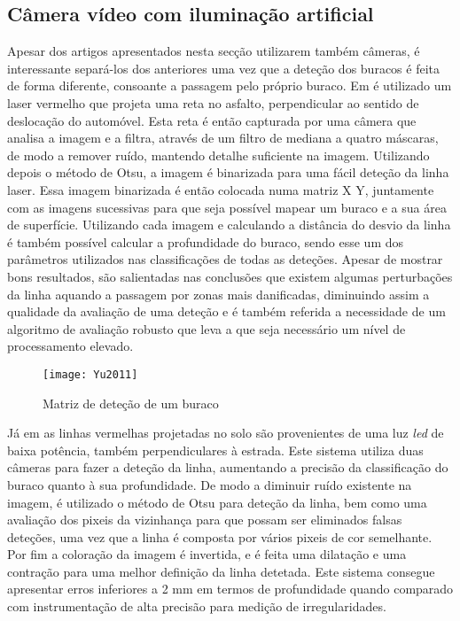 \subsection{Câmera vídeo com iluminação artificial}
\label{subsec: camera_video_com_iluminacao_artificial}
Apesar dos artigos apresentados nesta secção utilizarem também câmeras, é interessante separá-los dos anteriores uma vez que a deteção dos buracos é feita de forma diferente, consoante a passagem pelo próprio buraco. Em \cite{Yu2011} é utilizado um laser vermelho que projeta uma reta no asfalto, perpendicular ao sentido de deslocação do automóvel. Esta reta é então capturada por uma câmera que analisa a imagem e a filtra, através de um filtro de mediana a quatro máscaras, de modo a remover ruído, mantendo detalhe suficiente na imagem.
Utilizando depois o método de Otsu, a imagem é binarizada para uma fácil deteção da linha laser.
Essa imagem binarizada é então colocada numa matriz X Y, juntamente com as imagens sucessivas para que seja possível mapear um buraco e a sua área de superfície.
Utilizando cada imagem e calculando a distância do desvio da linha é também possível calcular a profundidade do buraco, sendo esse um dos parâmetros utilizados nas classificações de todas as deteções.
Apesar de mostrar bons resultados, são salientadas nas conclusões que existem algumas perturbações da linha aquando a passagem por zonas mais danificadas, diminuindo assim a qualidade da avaliação de uma deteção e é também referida a necessidade de um algoritmo de avaliação robusto que leva a que seja necessário um nível de processamento elevado.

\begin{figure}[htbp]
	\centering
	\texttt{[image: Yu2011]}
	\caption[Matriz de deteção de um buraco]{Matriz de deteção de um buraco \footnotemark}
	\label{fig:sensor_kinect}
\end{figure}

Já em \cite{He2011} as linhas vermelhas projetadas no solo são provenientes de uma luz \emph{led} de baixa potência, também perpendiculares à estrada. Este sistema utiliza duas câmeras para fazer a deteção da linha, aumentando a precisão da classificação do buraco quanto à sua profundidade.
De modo a diminuir ruído existente na imagem, é utilizado o método de Otsu para deteção da linha, bem como uma avaliação dos pixeis da vizinhança para que possam ser eliminados falsas deteções, uma vez que a linha é composta por vários pixeis de cor semelhante.
Por fim a coloração da imagem é invertida, e é feita uma dilatação e uma contração para uma melhor definição da linha detetada.
Este sistema consegue apresentar erros inferiores a 2 mm em termos de profundidade quando comparado com instrumentação de alta precisão para medição de irregularidades.

